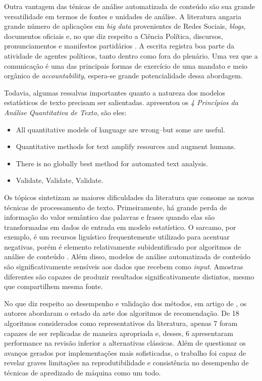 \documentclass[
12pt,				%
openright,			%
twoside,			%
a4paper,			%
english,			%
french,				%
spanish,			%
brazil				%
]{abntex2}
\begin{document}
Outra vantagem das ténicas de análise automatizada de conteúdo são sua grande versatilidade em termos de fontes e unidades de análise. A literatura angaria grande número de aplicações em \emph{big data} provenientes de Redes Sociais, \emph{blogs}, documentos oficiais e, no que diz respeito a Ciência Política, discursos, pronunciamentos e manifestos partidários \cite{grimmer2013text, wilkerson2017large, gentzkow2019text}. A escrita registra boa parte da atividade de agentes políticos, tanto dentro como fora do plenário. Uma vez que a comunicação é uma das principais formas de exercício de uma mandato e meio orgânico de \emph{accountability}, espera-se grande potencialidade dessa abordagem.

Todavia, algumas ressalvas importantes quanto a natureza dos modelos estatísticos de texto precisam ser salientadas.  apresentou os \emph{4 Princípios da Análise Quantitativa de Texto}, são eles:

\begin{itemize}
	\item All quantitative models of language are wrong–but some are useful.
	\item Quantitative methods for text amplify resources and augment humans.
	\item There is no globally best method for automated text analysis.
	\item Validate, Validate, Validate.
\end{itemize}

Os tópicos sintetizam as maiores dificuldades da literatura que consome as novas técnicas de processamento de texto. Primeiramente, há grande perda de informação do valor semântico das palavras e frases quando elas são transformadas em dados de entrada em modelo estatístico. O sarcamo, por exemplo, é um recursos liguístico frequentemente utilizado para acentuar negativas, porém é elemento relativamente subidentificado por algoritmos de análise de conteúdo \cite{maynard2014cares}. Além disso, modelos de análise automatizada de conteúdo são significativamente sensíveis aos dados que recebem como \emph{input}. Amostras diferentes são capazes de produzir resultados significativamente distintos, mesmo que compartilhem mesma fonte.  

No que diz respeito ao desempenho e validação dos métodos, em artigo de , os autores abordaram o estado da arte dos algoritmos de recomendação. De 18 algoritmos considerados como representativos da literatura, apenas 7 foram capazes de ser replicadas de maneira apropriada e, desses, 6 apresentaram performance na revisão inferior a alternativas clássicas. Além de questionar os avanços gerados por implementações mais sofisticadas, o trabalho foi capaz de revelar graves limitações na reprodutibilidade e consistência no desempenho de técnicas de apredizado de máquina como um todo.  
\end{document}
